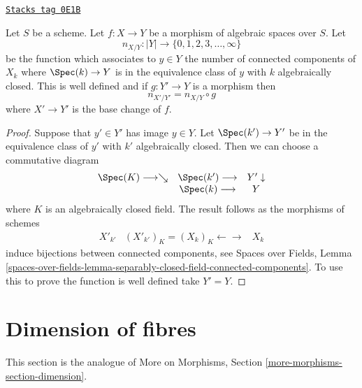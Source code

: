 \begin{lemma}
\label{spaces-more-morphisms-lemma-base-change-fibres-nr-geometrically-connected-components}
\href{https://stacks.math.columbia.edu/tag/0E1B}{\texttt{Stacks tag 0E1B}}

Let $S$ be a scheme.
Let $f : X \to Y$ be a morphism of algebraic spaces over $S$. Let
$$
n_{X/Y} : |Y| \to \{0, 1, 2, 3, \ldots, \infty\}
$$
be the function which associates to $y \in Y$ the number of connected
components of $X_k$ where $\Spec(k) \to Y$ is in the equivalence
class of $y$ with $k$ algebraically closed.
This is well defined and if $g : Y' \to Y$ is a morphism then
$$
n_{X'/Y'} = n_{X/Y} \circ g
$$
where $X' \to Y'$ is the base change of $f$.
\end{lemma}

\begin{proof}
Suppose that $y' \in Y'$ has image $y \in Y$. Let $\Spec(k') \to Y'$
be in the equivalence class of $y'$ with $k'$ algebraically closed.
Then we can choose a commutative diagram
$$
\begin{array}{ccc}\Spec(K) \longrightarrow\searrow & \Spec(k') \longrightarrow & Y' \downarrow \\  & \Spec(k) \longrightarrow & Y\end{array}
$$
where $K$ is an algebraically closed field.
The result follows as the morphisms of schemes
$$
\begin{array}{ccc}X'_{k'} & (X'_{k'})_K = (X_k)_K \longleftarrow\longrightarrow & X_k\end{array}
$$
induce bijections between connected components, see
Spaces over Fields, Lemma
\ref{spaces-over-fields-lemma-separably-closed-field-connected-components}.
To use this to prove the function is well defined take $Y' = Y$.
\end{proof}

\section{Dimension of fibres}
\label{spaces-more-morphisms-section-dimension}
This section is the analogue of
More on Morphisms, Section \ref{more-morphisms-section-dimension}.

